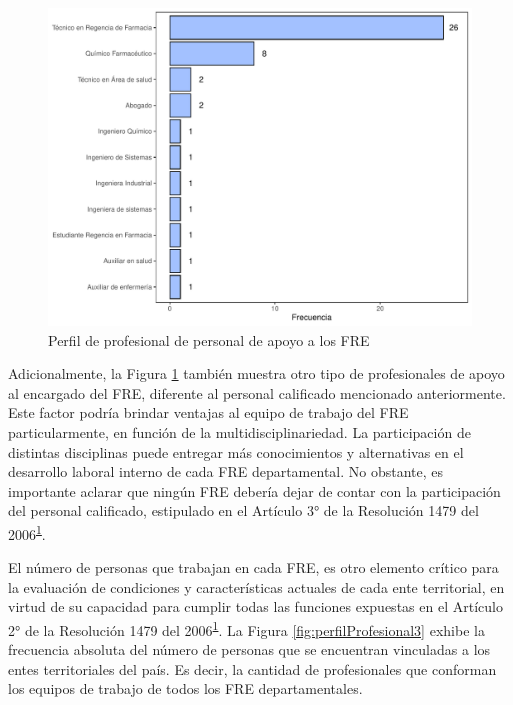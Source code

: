 \documentclass[
]{book}
\begin{document}
\begin{figure}
\includegraphics[width=0.9\linewidth]{InformeFinal_files/figure-latex/perfilProfesional2-1} \caption{Perfil de profesional de personal de apoyo a los FRE}\label{fig:perfilProfesional2}
\end{figure}

Adicionalmente, la Figura \ref{fig:perfilProfesional2} también muestra otro tipo de profesionales de apoyo al encargado del FRE, diferente al personal calificado mencionado anteriormente. Este factor podría brindar ventajas al equipo de trabajo del FRE particularmente, en función de la multidisciplinariedad. La participación de distintas disciplinas puede entregar más conocimientos y alternativas en el desarrollo laboral interno de cada FRE departamental. No obstante, es importante aclarar que ningún FRE debería dejar de contar con la participación del personal calificado, estipulado en el Artículo 3° de la Resolución 1479 del 2006\textsuperscript{\protect\hyperlink{ref-MSPS1479-2006}{1}}.

El número de personas que trabajan en cada FRE, es otro elemento crítico para la evaluación de condiciones y características actuales de cada ente territorial, en virtud de su capacidad para cumplir todas las funciones expuestas en el Artículo 2° de la Resolución 1479 del 2006\textsuperscript{\protect\hyperlink{ref-MSPS1479-2006}{1}}. La Figura \ref{fig:perfilProfesional3} exhibe la frecuencia absoluta del número de personas que se encuentran vinculadas a los entes territoriales del país. Es decir, la cantidad de profesionales que conforman los equipos de trabajo de todos los FRE departamentales.
\end{document}
